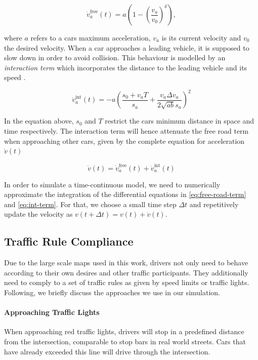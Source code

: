\documentclass[11pt]{article}
\begin{document}
\begin{equation}
	\label{eq:free-road-term}
	\dot{v}_a^{\mathrm{free}}(t) = a ( 1 - ( \frac{v_a}{v_0} )^\delta),
\end{equation}

where $a$ refers to a cars maximum acceleration, $v_a$ is its current velocity and $v_0$ the desired velocity. When a car approaches a leading vehicle, it is supposed to slow down in order to avoid collision. This behaviour is modelled by an \textit{interaction term} which incorporates the distance to the leading vehicle and its speed \citep{treiber2000congested}. 

\begin{equation}
	\label{eq:int-term}
	\dot{v}_a^{\mathrm{int}}(t) = - a ( \frac{s_0 + v_a T}{s_a} + \frac{v_a \Delta v_a}{2 \sqrt{ab} s_a} )^2
\end{equation}

In the equation above, $s_0$ and $T$ restrict the cars minimum distance in space and time respectively. The interaction term will hence attenuate the free road term when approaching other cars, given by the complete equation for acceleration $\dot{v}(t)$

\begin{equation}
	\dot{v}(t) = \dot{v}_a^{\mathrm{free}}(t) + \dot{v}_a^{\mathrm{int}}(t)
\end{equation}

In order to simulate a time-continuous model, we need to numerically approximate the integration of the differential equations in \ref{eq:free-road-term} and \ref{eq:int-term}. For that, we choose a small time step $\Delta t$ and repetitively update the velocity as $v(t + \Delta t) = v(t) + \dot{v}(t)$.

\subsection{Traffic Rule Compliance}
Due to the large scale maps used in this work, drivers not only need to behave according to their own desires and other traffic participants. They additionally need to comply to a set of traffic rules as given by speed limits or traffic lights. Following, we briefly discuss the approaches we use in our simulation.

\paragraph{Approaching Traffic Lights} When approaching red traffic lights, drivers will stop in a predefined distance from the intersection, comparable to stop bars in real world streets. Cars that have already exceeded this line will drive through the intersection. 
\end{document}
